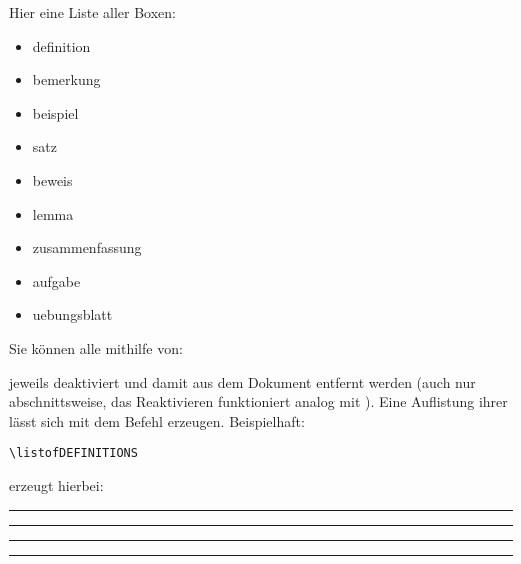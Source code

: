 Hier eine Liste aller Boxen:
\begin{multicols}{3}
    \begin{itemize}[label=$\diamond$]\narrowitems
        \item definition
        \item bemerkung
        \item beispiel
        \item satz
        \item beweis
        \item lemma
        \item zusammenfassung
        \item aufgabe
        \item uebungsblatt
    \end{itemize}
\end{multicols}
Sie können alle mithilfe von:
\begin{latex}
\end{latex}
jeweils deaktiviert und damit aus dem Dokument entfernt werden (auch nur abschnittsweise, das Reaktivieren funktioniert analog mit ). \newline
Eine Auflistung ihrer lässt sich mit dem  Befehl erzeugen. Beispielhaft:
\begin{lstlisting}[language=lLatex]
\listofDEFINITIONS
\end{lstlisting}
erzeugt hierbei:\\
\rule{\linewidth}{1.2pt}\vspace{-0.75\baselineskip}
\rule{\linewidth}{0.6pt}\vspace*{-1.5cm}
\listofDEFINITIONS
\rule{\linewidth}{0.6pt}\vspace{-0.7\baselineskip}
\rule{\linewidth}{1.2pt}

\clearpage
\newcommand{\printmark}[2][Linkname]{\ensuremath{\text{#1}^{\rightarrow~\text{\pageref{#2}}}}}





